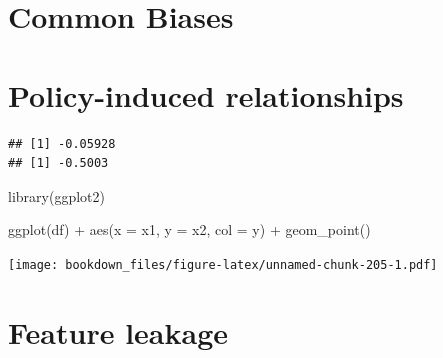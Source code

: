 \documentclass[
]{krantz}
\makeatletter
\newenvironment{Shaded}{\begin{snugshade}}{\end{snugshade}}
\newcommand{\AttributeTok}[1]{\textcolor[rgb]{0.61,0.61,0.61}{#1}}
\newcommand{\DecValTok}[1]{\textcolor[rgb]{0.06,0.06,0.06}{#1}}
\newcommand{\FunctionTok}[1]{\textcolor[rgb]{0,0,0}{#1}}
\newcommand{\NormalTok}[1]{#1}
\newcommand{\OtherTok}[1]{\textcolor[rgb]{0.37,0.37,0.37}{#1}}
\newcommand{\SpecialCharTok}[1]{\textcolor[rgb]{0,0,0}{#1}}
\newenvironment{kframe}{%
\medskip{}
\setlength{\fboxsep}{.8em}
 \def\at@end@of@kframe{}%
 \ifinner\ifhmode%
  \def\at@end@of@kframe{\end{minipage}}%
  \begin{minipage}{\columnwidth}%
 \fi\fi%
 \def\FrameCommand##1{\hskip\@totalleftmargin \hskip-\fboxsep
 \colorbox{shadecolor}{##1}\hskip-\fboxsep
     \hskip-\linewidth \hskip-\@totalleftmargin \hskip\columnwidth}%
 \MakeFramed {\advance\hsize-\width
   \@totalleftmargin\z@ \linewidth\hsize
   \@setminipage}}%
 {\par\unskip\endMakeFramed%
 \at@end@of@kframe}
\renewenvironment{Shaded}{\begin{kframe}}{\end{kframe}}
\makeatother
\begin{document}
\hypertarget{common-biases}{%
\section{Common Biases}\label{common-biases}}

\hypertarget{policy-induced-relationships}{%
\section{Policy-induced relationships}\label{policy-induced-relationships}}

\begin{Shaded}
\end{Shaded}

\begin{verbatim}
## [1] -0.05928
## [1] -0.5003
\end{verbatim}

\begin{Shaded}
\begin{Highlighting}[]
\FunctionTok{library}\NormalTok{(ggplot2)}

\FunctionTok{ggplot}\NormalTok{(df) }\SpecialCharTok{+}
  \FunctionTok{aes}\NormalTok{(}\AttributeTok{x =}\NormalTok{ x1, }\AttributeTok{y =}\NormalTok{ x2, }\AttributeTok{col =}\NormalTok{ y) }\SpecialCharTok{+}
  \FunctionTok{geom\_point}\NormalTok{()}
\end{Highlighting}
\end{Shaded}

\texttt{[image: bookdown\_files/figure-latex/unnamed-chunk-205-1.pdf]}

\hypertarget{feature-leakage}{%
\section{Feature leakage}\label{feature-leakage}}
\end{document}
